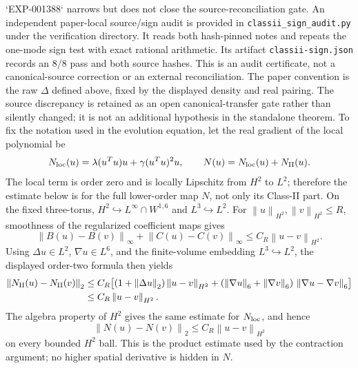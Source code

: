 \documentclass[11pt]{article}
\numberwithin{equation}{section}
\theoremstyle{definition}
\newcommand{\norm}[1]{\left\lVert#1\right\rVert}
\begin{document}
`EXP-001388` narrows but does not close the source-reconciliation gate.
An independent paper-local source/sign audit is provided in
\texttt{classii\_sign\_audit.py} under the verification directory.  It reads
both hash-pinned notes and repeats the one-mode sign test with exact rational
arithmetic.  Its artifact \texttt{classii-sign.json} records an $8/8$ pass and
both source hashes.  This is an audit certificate, not a canonical-source
correction or an external reconciliation.
The paper convention is the raw $\Delta$ defined above, fixed by the displayed density and real
pairing.  The source discrepancy is retained as an open canonical-transfer
gate rather than silently changed; it is not an additional hypothesis in the
standalone theorem.  To fix the notation used in
the evolution equation, let the real gradient of the local polynomial be
\begin{equation}
 N_{\rm loc}(u)=\lambda (u^Tu)u+\gamma (u^Tu)^2u,
 \qquad N(u)=N_{\rm loc}(u)+N_{\rm II}(u).
 \label{eq:full-nonlinear-map}
\end{equation}
The local term is order zero and is locally Lipschitz from $H^2$ to $L^2$;
therefore the estimate below is for the full lower-order map $N$, not only its
Class-II part.  On the fixed three-torus,
$H^2\hookrightarrow L^\infty\cap W^{1,6}$ and $L^3\hookrightarrow L^2$.
For $\norm{u}_{H^2},\norm{v}_{H^2}\le R$, smoothness of the regularized
coefficient maps gives
\begin{equation}
 \norm{B(u)-B(v)}_{\infty}+\norm{C(u)-C(v)}_{\infty}
 \le C_R\norm{u-v}_{H^2}.
 \label{eq:coefficient-lipschitz}
\end{equation}
Using $\Delta u\in L^2$, $\nabla u\in L^6$, and the finite-volume embedding
$L^3\hookrightarrow L^2$, the displayed order-two formula then yields
\begin{align}
 \norm{N_{\rm II}(u)-N_{\rm II}(v)}_2
 &\le C_R\bigl[(1+\norm{\Delta u}_2)\norm{u-v}_{H^2}
       +(\norm{\nabla u}_6+\norm{\nabla v}_6)\,
          \norm{\nabla u-\nabla v}_6\bigr] \\
 &\le C_R\norm{u-v}_{H^2}.
 \label{eq:classii-lipschitz}
\end{align}
The algebra property of $H^2$ gives the same estimate for $N_{\rm loc}$,
and hence
\begin{equation}
 \norm{N(u)-N(v)}_2\le C_R\norm{u-v}_{H^2}
 \label{eq:local-lipschitz}
\end{equation}
on every bounded $H^2$ ball.  This is the product estimate used by the
contraction argument; no higher spatial derivative is hidden in $N$.
\end{document}
